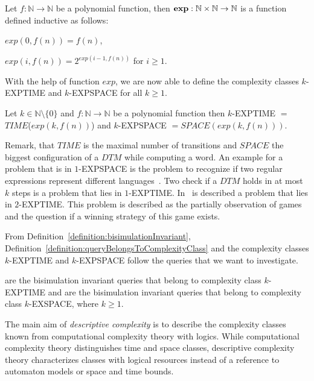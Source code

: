 \begin{definition}
    Let $f: \mathbb{N} \rightarrow \mathbb{N}$ be a polynomial function, then $\emph{exp}: \mathbb{N} \times \mathbb{N}
    \rightarrow \mathbb{N}$ is a function defined inductive as follows:
    \begin{compactitem}
        \item $exp(0, f(n)) = f(n)$,
        \item $exp(i, f(n)) = 2^{exp(i - 1, f(n))}$ for $i \geq 1$.
    \end{compactitem}
\end{definition}

With the help of function $exp$, we are now able to define the complexity classes $k$-EXPTIME and $k$-EXPSPACE for
all $k \geq 1$.

\begin{definition}
    Let $k \in \mathbb{N} \setminus \{0\}$ and $f: \mathbb{N} \rightarrow \mathbb{N}$ be a polynomial function then
    $k$-EXPTIME $=$ $\mathit{TIME}$($exp(k, f(n))$) and $k$-EXPSPACE $= \mathit{SPACE}(exp(k, f(n)))$.
\end{definition}

Remark, that $\mathit{TIME}$ is the maximal number of transitions and $\mathit{SPACE}$ the biggest configuration of a
$\mathit{DTM}$ while computing a word. An example for a problem that is in $1$-EXPSPACE is the problem to recognize
if two regular expressions represent different languages~\cite{meyer1972equivalence}. Two check if a $\mathit{DTM}$
holds in at most $k$ steps is a problem that lies in $1$-EXPTIME. In~\cite{rintanen2004complexity} is described a
problem that lies in $2$-EXPTIME. This problem is described as the partially observation of games and the question if a
winning strategy of this game exists.

From Definition~\ref{definition:bisimulationInvariant}, Definition~\ref{definition:queryBelongsToComplexityClass}
and the complexity classes $k$-EXPTIME and $k$-EXPSPACE follow the queries that we want to investigate.

\begin{definition}
    \label{definition:kExptimekExpspace}
     are the bisimulation invariant queries that belong to complexity class $k$-EXPTIME and
     are the bisimulation invariant queries that belong to complexity class $k$-EXSPACE, where $k \geq 1$.
\end{definition}

The main aim of \emph{descriptive complexity} is to describe the complexity classes known from
computational complexity theory with logics. While computational complexity theory distinguishes time and space
classes, descriptive complexity theory characterizes classes with logical resources instead of a reference to
automaton models or space and time bounds.

